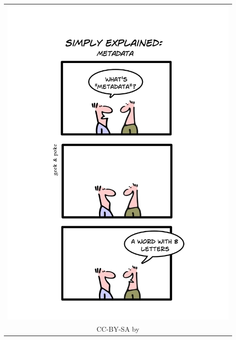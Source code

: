 \thispagestyle{empty}
\begin{center}
\vspace*{\fill}
\vfill
\end{center}
\cleardoublepage


\thispagestyle{empty}
\begin{center}
\vspace*{\fill}
\begin{tabular}{c}
\includegraphics[width=12cm]{img/geekandpokemetadata.jpg} \\
CC-BY-SA by \textcite{Widder2010} \\
\end{tabular}
\vfill
\end{center}


